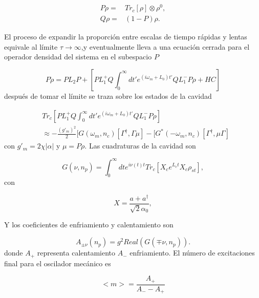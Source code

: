 \documentclass[10pt,a4paper]{report}
\begin{document}
\begin{align}
P\rho=&Tr_c[\rho]\otimes \rho^{0}, \\
Q\rho=&(1-P)\rho.
\end{align}



El proceso de expandir la proporción entre escalas de tiempo rápidas y
lentas equivale al límite $\tau \rightarrow \infty$,y eventualmente
lleva a una ecuación cerrada para el operador densidad del sistema en
el subespacio $P$ 


\begin{equation}
P\dot{\rho} = PL_2P + [PL^+_1Q \int_0^\infty dt' e^{(i\omega_m +L_0)t'}QL_1^- P\rho + HC]
\end{equation} después de tomar el límite se traza sobre los estados de la cavidad

\begin{align}
&Tr_c[PL^+_1Q \int_0^\infty dt' e^{(i\omega_m +L_0)t'}QL_1^- P\rho] \\
&\approx -\frac{(g'_m)^2}{2}[G(\omega_m,n_c)[\Gamma^\dagger,\Gamma\mu]-[G^*(-\omega_m,n_c)[\Gamma^\dagger,\mu\Gamma] \nonumber
\end{align} con $g'_m = 2\chi|\alpha|$ y $\mu = P\rho$. Las cuadraturas de la cavidad son

\begin{equation} \label{CavityQuadrature}
G(\nu,n_p) = \int_0^\infty dt e^{i\nu(t) t}Tr_c[X_c e^{L_c t} X_c \rho_{st}],
\end{equation} con 


\begin{equation}
X = \frac{a + a^\dagger}{\sqrt{2}\alpha_0},
\end{equation}

Y los coeficientes de enfriamiento y calentamiento son


\begin{equation}
A_{\pm \nu}(n_p) = g^2Real(G(\mp \nu,n_p)).
\end{equation} donde $A_+$ representa calentamiento $A_-$ enfriamiento. El número de excitaciones final para el oscilador mecánico es

\begin{equation}
<m> = \frac{A_+}{A_- - A_+}
\end{equation}
\end{document}
